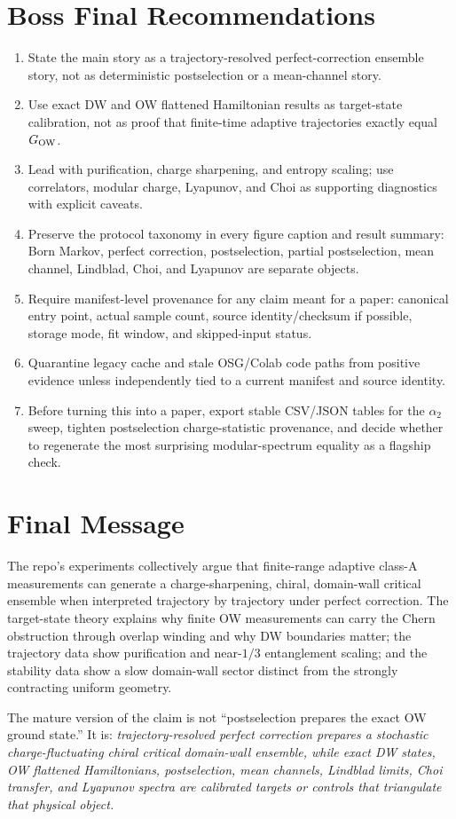 \documentclass[aps,prb,onecolumn,nofootinbib,superscriptaddress]{revtex4-2}
\newcommand{\GO}{G_{\rm OW}}
\begin{document}
\section{Boss Final Recommendations}

\begin{enumerate}
\item State the main story as a trajectory-resolved perfect-correction ensemble story, not as deterministic postselection or a mean-channel story.
\item Use exact DW and OW flattened Hamiltonian results as target-state calibration, not as proof that finite-time adaptive trajectories exactly equal \(\GO\).
\item Lead with purification, charge sharpening, and entropy scaling; use correlators, modular charge, Lyapunov, and Choi as supporting diagnostics with explicit caveats.
\item Preserve the protocol taxonomy in every figure caption and result summary: Born Markov, perfect correction, postselection, partial postselection, mean channel, Lindblad, Choi, and Lyapunov are separate objects.
\item Require manifest-level provenance for any claim meant for a paper: canonical entry point, actual sample count, source identity/checksum if possible, storage mode, fit window, and skipped-input status.
\item Quarantine legacy cache and stale OSG/Colab code paths from positive evidence unless independently tied to a current manifest and source identity.
\item Before turning this into a paper, export stable CSV/JSON tables for the \(\alpha_2\) sweep, tighten postselection charge-statistic provenance, and decide whether to regenerate the most surprising modular-spectrum equality as a flagship check.
\end{enumerate}

\section{Final Message}

The repo's experiments collectively argue that finite-range adaptive class-A measurements can generate a charge-sharpening, chiral, domain-wall critical ensemble when interpreted trajectory by trajectory under perfect correction.  The target-state theory explains why finite OW measurements can carry the Chern obstruction through overlap winding and why DW boundaries matter; the trajectory data show purification and near-\(1/3\) entanglement scaling; and the stability data show a slow domain-wall sector distinct from the strongly contracting uniform geometry.

The mature version of the claim is not ``postselection prepares the exact OW ground state.''  It is: \emph{trajectory-resolved perfect correction prepares a stochastic charge-fluctuating chiral critical domain-wall ensemble, while exact DW states, OW flattened Hamiltonians, postselection, mean channels, Lindblad limits, Choi transfer, and Lyapunov spectra are calibrated targets or controls that triangulate that physical object.}
\end{document}
